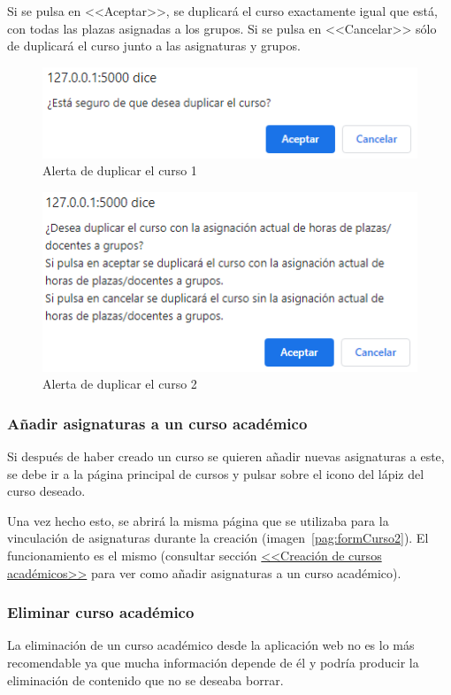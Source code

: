 Si se pulsa en <<Aceptar>>, se duplicará el curso exactamente igual que está, con todas las plazas asignadas a los grupos. 
Si se pulsa en <<Cancelar>> sólo de duplicará el curso junto a las asignaturas y grupos.

\begin{figure}
	\centering
	\includegraphics[width=.65\textwidth]{../img/Anexos/Manual usuario/alertCurso1.png}
	\caption{Alerta de duplicar el curso 1}\label{pag:alertCurso1}
\end{figure}

\begin{figure}
	\centering
	\includegraphics[width=.7\textwidth]{../img/Anexos/Manual usuario/alertCurso2.png}
	\caption{Alerta de duplicar el curso 2}\label{pag:alertCurso2}
\end{figure}

\subsubsection{Añadir asignaturas a un curso académico}
Si después de haber creado un curso se quieren añadir nuevas asignaturas a este, se debe ir a la página principal de cursos y pulsar sobre el icono del lápiz del curso deseado.

Una vez hecho esto, se abrirá la misma página que se utilizaba para la vinculación de asignaturas durante la creación (imagen~\ref{pag:formCurso2}).
El funcionamiento es el mismo (consultar sección \hyperref[section:crearCurso]{<<Creación de cursos académicos>>} para ver como añadir asignaturas a un curso académico).

\subsubsection{Eliminar curso académico}
La eliminación de un curso académico desde la aplicación web no es lo más recomendable ya que mucha información depende de él y podría producir la eliminación de contenido que no se deseaba borrar.


